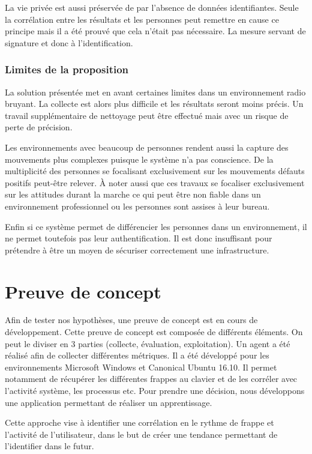 \documentclass[conference,compsoc]{IEEEtran}
\begin{document}
La vie privée est aussi préservée de par l'absence de données identifiantes. Seule la corrélation entre les résultats et les personnes peut remettre en cause ce principe mais il a été prouvé que cela n'était pas nécessaire. La mesure servant de signature et donc à l'identification.

\subsubsection{Limites de la proposition}

La solution présentée met en avant certaines limites dans un environnement radio bruyant. La collecte est alors plus difficile et les résultats seront moins précis. Un travail supplémentaire de nettoyage peut être effectué mais avec un risque de perte de précision. 

Les environnements avec beaucoup de personnes rendent aussi la capture des mouvements plus complexes puisque le système n'a pas conscience. De la multiplicité des personnes se focalisant exclusivement sur les mouvements défauts positifs peut-être relever. À noter aussi que ces travaux se focaliser exclusivement sur les attitudes durant la marche ce qui peut être non fiable dans un environnement professionnel ou les personnes sont assises à leur bureau.

Enfin si ce système permet de différencier les personnes dans un environnement, il ne permet toutefois pas leur authentification. Il est donc insuffisant pour prétendre à être un moyen de sécuriser correctement une infrastructure.

\section{Preuve de concept}
Afin de tester nos hypothèses, une preuve de concept est en cours de développement.
 Cette preuve de concept est composée de différents éléments. On peut le diviser en 3 parties (collecte, évaluation, exploitation). Un agent a été réalisé afin de collecter différentes métriques.
 Il a été développé pour les environnements Microsoft Windows et Canonical Ubuntu 16.10.
 Il permet notamment de récupérer les différentes frappes au clavier et de les corréler avec l'activité système, les processus etc.
 Pour prendre une décision, nous développons une application permettant de réaliser un apprentissage.
 
 Cette approche vise à identifier une corrélation en le rythme de frappe et l'activité de l'utilisateur, dans le but de créer une tendance permettant de l'identifier dans le futur.
\end{document}

